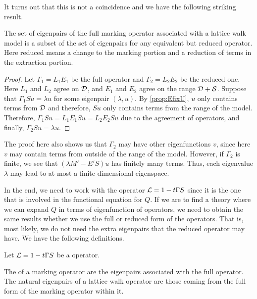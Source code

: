 It turns out that this is not a coincidence and we have the following striking result.

\begin{prop} The set of eigenpairs of the full marking operator associated with a lattice walk model is a subset of the set of eigenpairs for any equivalent but reduced operator. Here reduced means a change to the marking portion and a reduction of terms in the extraction portion.
\end{prop}
\begin{proof} Let $\Gamma_1 = L_1 E_1$ be the full operator and $\Gamma_2 = L_2 E_2$ be the reduced one. Here $L_1$ and $L_2$ agree on $\mathcal{D}$, and $E_1$ and $E_2$ agree on the range $\mathcal{D} + \mathcal{S}$. Suppose that $\Gamma_1 Su = \lambda u$ for some eigenpair $(\lambda, u)$. By \autoref{prop:EfixU}, $u$ only contains terms from $\mathcal{D}$ and therefore, $Su$ only contains terms from the range of the model. Therefore, $\Gamma_1 Su = L_1 E_1 Su = L_2 E_2 Su$ due to the agreement of operators, and finally, $\Gamma_2 Su = \lambda u$.
\end{proof}

The proof here also shows us that $\Gamma_2$ may have other eigenfunctions $v$, since here $v$ may contain terms from outside of the range of the model. However, if $\Gamma_2$ is finite, we see that $(\lambda M' - E'S)u$ has finitely many terms. Thus, each eigenvalue $\lambda$ may lead to at most a finite-dimensional eigenspace.

In the end, we need to work with the operator $\mathcal{L} = 1 - t\Gamma S$ since it is the one that is involved in the functional equation for $Q$. If we are to find a theory where we can expand $Q$ in terms of eigenfunction of operators, we need to obtain the same results whether we use the full or reduced form of the operators. That is, most likely, we do not need the extra eigenpairs that the reduced operator may have. We have the following definitions.

\begin{defn} Let $\mathcal{L} = 1 - t\Gamma S$ be a  operator.
\end{defn}

\begin{defn} The  of a marking operator are the eigenpairs associated with the full operator. The natural eigenpairs of a lattice walk operator are those coming from the full form of the marking operator within it.
\end{defn}

